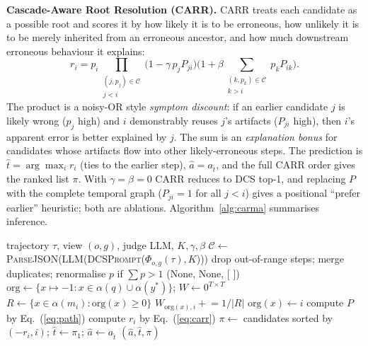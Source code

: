 \documentclass[conference]{IEEEtran}
\begin{document}
\textbf{Cascade-Aware Root Resolution (CARR).} CARR treats each candidate as a possible root and scores it by how likely it is to be erroneous, how unlikely it is to be merely inherited from an erroneous ancestor, and how much downstream erroneous behaviour it explains:
\begin{equation}
r_i=p_i\prod_{\substack{(j,p_j)\in\mathcal{C}\\ j<i}}\big(1-\gamma\,p_jP_{ji}\big)\Big(1+\beta\!\!\sum_{\substack{(k,p_k)\in\mathcal{C}\\ k>i}}\!\! p_kP_{ik}\Big).\label{eq:carr}
\end{equation}
The product is a noisy-OR style \emph{symptom discount}: if an earlier candidate $j$ is likely wrong ($p_j$ high) and $i$ demonstrably reuses $j$'s artifacts ($P_{ji}$ high), then $i$'s apparent error is better explained by $j$. The sum is an \emph{explanation bonus} for candidates whose artifacts flow into other likely-erroneous steps. The prediction is $\hat t=\arg\max_i r_i$ (ties to the earlier step), $\hat a=a_{\hat t}$, and the full CARR order gives the ranked list $\pi$. With $\gamma=\beta=0$ CARR reduces to DCS top-1, and replacing $P$ with the complete temporal graph ($P_{ji}=1$ for all $j<i$) gives a positional ``prefer earlier'' heuristic; both are ablations. Algorithm~\ref{alg:carma} summarises inference.

\begin{algorithm}[t]
\caption{CARMA inference (DCS + APG + CARR)}\label{alg:carma}
\footnotesize
\begin{algorithmic}[1]
\Require trajectory $\tau$, view $(o,g)$, judge LLM, $K,\gamma,\beta$
\State $\mathcal{C}\gets$ \textsc{ParseJSON}(LLM(\textsc{DCSPrompt}($\Phi_{o,g}(\tau),K$))) 
\State drop out-of-range steps; merge duplicates; renormalise $p$ if $\sum p>1$
 \Return (None, None, [ ]) \EndIf
\State $\mathrm{org}\gets\{x\mapsto -1: x\in\alpha(q)\cup\alpha(y^*)\}$; $W\gets 0^{T\times T}$
  \State $R\gets\{x\in\alpha(m_i):\mathrm{org}(x)\ge 0\}$
   $W_{\mathrm{org}(x),i}\mathrel{+}=1/|R|$ \EndFor
   $\mathrm{org}(x)\gets i$ \EndFor
\EndFor
\State compute $P$ by Eq.~(\ref{eq:path})
 compute $r_i$ by Eq.~(\ref{eq:carr}) \EndFor
\State $\pi\gets$ candidates sorted by $(-r_i, i)$; $\hat t\gets\pi_1$; $\hat a\gets a_{\hat t}$
\State \Return $(\hat a,\hat t,\pi)$
\end{algorithmic}
\end{algorithm}
\end{document}
